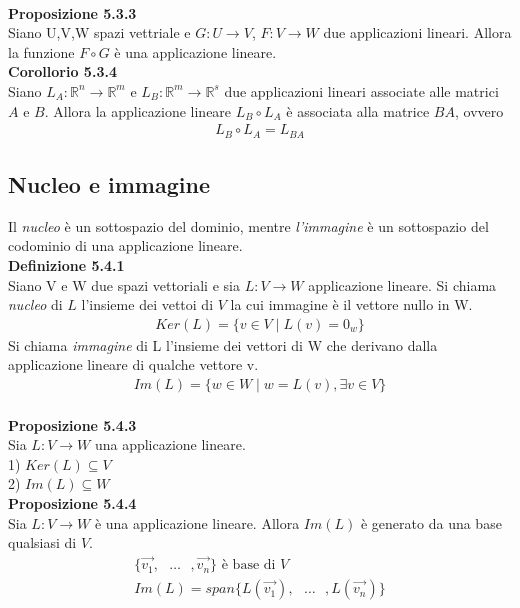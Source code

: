 \documentclass{article}
\begin{document}
\vspace{5px}
\textbf{\\Proposizione 5.3.3}
\\Siano U,V,W spazi vettriale e $G : U \to V$, $F : V \to W$ due applicazioni lineari. Allora la funzione $F \circ G$ è una applicazione lineare.
\vspace{10px}
\textbf{\\Corollorio 5.3.4}
\\ Siano $L_A : \mathbb{R}^n \to \mathbb{R}^m$ e $L_B : \mathbb{R}^m \to \mathbb{R}^s$ due applicazioni lineari associate alle matrici $A$ e $B$. Allora la applicazione lineare $L_B \circ L_A$ è associata alla matrice $BA$, ovvero
\begin{align*}
  L_B \circ L_A = L_{BA}
\end{align*}

\vspace{1em}
\subsection{Nucleo e immagine}
Il \textit{nucleo} è un sottospazio del dominio, mentre \textit{l'immagine} è un sottospazio del codominio di una applicazione lineare.
\vspace{5px}
\textbf{\\Definizione 5.4.1}
\\Siano V e W due spazi vettoriali e sia $L : V \to W$ applicazione lineare. Si chiama \textit{nucleo} di $L$ l'insieme dei vettoi di $V$ la cui immagine è il vettore nullo in W.
\begin{align*}
  Ker(L)=\{v\in V \mid L(v)=0_w\}
\end{align*}
Si chiama \textit{immagine} di L l'insieme dei vettori di W che derivano dalla applicazione lineare di qualche vettore v.
\begin{align*}
  Im(L)=\{w\in W \mid w=L(v),\exists v \in V\}
\end{align*}
\vspace{5px}
\textbf{\\Proposizione 5.4.3}
\\ Sia $L : V \to W$ una applicazione lineare.
\\ 1) $Ker(L) \subseteq V$
\\ 2) $Im(L) \subseteq W$
\vspace{5px}
\textbf{\\Proposizione 5.4.4}
\\Sia $L : V \to W$ è una applicazione lineare. Allora $Im(L)$ è generato da una base qualsiasi di $V$.
\begin{align*}
  \{\vec{v_1},\text{ }\dots\text{ },\vec{v_n}\}\text{ è base di } V \\
  Im(L)=span\{L(\vec{v_1}),\text{ }\dots\text{ },L(\vec{v_n})\}
\end{align*}
\end{document}
